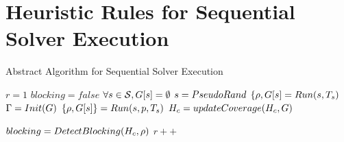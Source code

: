 \section{Heuristic Rules for Sequential Solver Execution}



\begin{algorithm}
\caption{Abstract Algorithm for Sequential Solver Execution \label{algoSolverCombination}}
\begin{algorithmic}
\State {}
\State {}
\State {}

\State $r = 1$
\State $blocking = false$
\State $\forall s  \in  \mathcal{S}, G [ s ] = \emptyset$   	
	 \State $s = PseudoRand$
	 \State {}   
	 \State $\{ \rho, G [s] = Run(s, T_{s})$ 
	  \Else
	 \ForAll{$\solver \in \solverset$}  		
		\State $\Gamma = Init(G)$
		\State {}
  		\State $\{ \rho, G[s] \} = Run(s, p, T_{s})$
		\State $H_c = updateCoverage(H_c,  G)$
      	
 	 \EndFor
         \EndIf	
         \State
\State {}
\State $blocking =  DetectBlocking(H_c, \rho)$ 
\State $r++$
\EndWhile
\end{algorithmic}
\end{algorithm}

